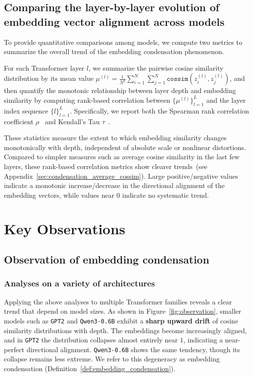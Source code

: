 \documentclass{article}
\theoremstyle{plain}
\theoremstyle{definition}
\theoremstyle{remark}
\begin{document}
\subsection{Comparing the layer-by-layer evolution of embedding vector alignment across models}

To provide quantitative comparisons among models, we compute two metrics to summarize the overall trend of the embedding condensation phenomenon.

For each Transformer layer $l$, we summarize the pairwise cosine similarity distribution by its mean value
$\mu^{(l)} = \frac{1}{N^2} \sum_{i=1}^{N} \sum_{j=1}^{N} \texttt{cossim}\!\left(z_i^{(l)}, z_j^{(l)}\right)$, and then quantify the monotonic relationship between layer depth and embedding similarity by computing rank-based correlation between $\{\mu^{(l)}\}_{l=1}^{L}$ and the layer index sequence $\{l\}_{l=1}^{L}$. Specifically, we report both the Spearman rank correlation coefficient $\rho$~\cite{Spearman_corr} and Kendall's Tau $\tau$~\cite{Kendall_tau}.

These statistics measure the extent to which embedding similarity changes monotonically with depth, independent of absolute scale or nonlinear distortions. Compared to simpler measures such as average cosine similarity in the last few layers, these rank-based correlation metrics show clearer trends~(see Appendix~\ref{sec:condensation_average_cossim}). Large positive/negative values indicate a monotonic increase/decrease in the directional alignment of the embedding vectors, while values near $0$ indicate no systematic trend.

\vspace{-4pt}
\section{Key Observations}
\subsection{Observation of embedding condensation}
\label{sec:observation}

\subsubsection{Analyses on a variety of architectures}

Applying the above analyses to multiple Transformer families reveals a clear trend that depend on model sizes. As shown in Figure~\ref{fig:observation}, smaller models such as \texttt{GPT2} and \texttt{Qwen3-0.6B} exhibit a \textbf{sharp upward drift} of cosine similarity distributions with depth. The embeddings become increasingly aligned, and in \texttt{GPT2} the distribution collapses almost entirely near $1$, indicating a near-perfect directional alignment. \texttt{Qwen3-0.6B} shows the same tendency, though its collapse remains less extreme. We refer to this degeneracy as embedding condensation (Definition~\ref{def:embedding_condensation}).
\end{document}
